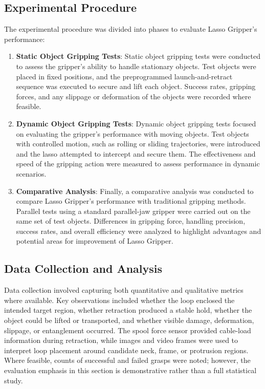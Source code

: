 \subsection{Experimental Procedure}
The experimental procedure was divided into phases to evaluate Lasso Gripper's performance:
\begin{enumerate}
    \item \textbf{Static Object Gripping Tests}: Static object gripping tests were conducted to assess the gripper's ability to handle stationary objects. Test objects were placed in fixed positions, and the preprogrammed launch-and-retract sequence was executed to secure and lift each object. Success rates, gripping forces, and any slippage or deformation of the objects were recorded where feasible.

\item \textbf{Dynamic Object Gripping Tests}: Dynamic object gripping tests focused on evaluating the gripper's performance with moving objects. Test objects with controlled motion, such as rolling or sliding trajectories, were introduced and the lasso attempted to intercept and secure them. The effectiveness and speed of the gripping action were measured to assess performance in dynamic scenarios.

\item \textbf{Comparative Analysis}: Finally, a comparative analysis was conducted to compare Lasso Gripper's performance with traditional gripping methods. Parallel tests using a standard parallel-jaw gripper were carried out on the same set of test objects. Differences in gripping force, handling precision, success rates, and overall efficiency were analyzed to highlight advantages and potential areas for improvement of Lasso Gripper.
\end{enumerate}


\subsection{Data Collection and Analysis}
Data collection involved capturing both quantitative and qualitative metrics where available. Key observations included whether the loop enclosed the intended target region, whether retraction produced a stable hold, whether the object could be lifted or transported, and whether visible damage, deformation, slippage, or entanglement occurred. The spool force sensor provided cable-load information during retraction, while images and video frames were used to interpret loop placement around candidate neck, frame, or protrusion regions. Where feasible, counts of successful and failed grasps were noted; however, the evaluation emphasis in this section is demonstrative rather than a full statistical study.

